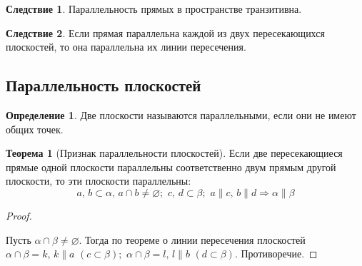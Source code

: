 \documentclass[12pt]{article}
\theoremstyle{definition}
\newtheorem{theorem}{Теорема}[section]
\newtheorem{definition}{Определение}
\newtheorem{consequence}{Следствие}[subsection]
\begin{document}
\begin{consequence}
    Параллельность прямых в пространстве транзитивна.
\end{consequence}
\begin{consequence}
    Если прямая параллельна каждой из двух пересекающихся плоскостей,
то она параллельна их линии пересечения.
\end{consequence}

\subsection{Параллельность плоскостей}

\begin{definition}
    Две плоскости называются параллельными, если они не имеют общих точек.
\end{definition}

\begin{theorem}[Признак параллельности плоскостей]
    Если две пересекающиеся прямые одной плоскости параллельны соответственно двум прямым другой плоскости, то эти плоскости параллельны:
    $$a,\,b\subset\alpha,\,a\cap b\neq\varnothing;\,\,c,\,d\subset\beta;\,\,a\parallel c,\,b\parallel d\Longrightarrow \alpha\parallel\beta$$
\end{theorem}
\begin{proof}
    $ $\newline
    \begin{center}
    \end{center}
    Пусть $\alpha\cap\beta\neq\varnothing$. Тогда по теореме о линии пересечения плоскостей $\alpha\cap\beta=k,\,k\parallel a\,\,(c\subset\beta);\,\,\alpha\cap\beta=l,\,l\parallel b\,\,(d\subset\beta).$ Противоречие. 
\end{proof}
\end{document}
